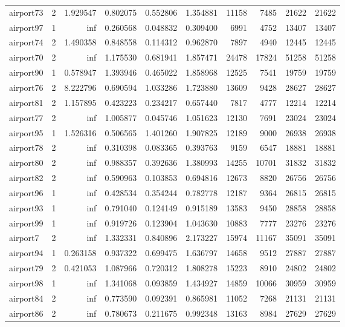\begin{longtable}{|l|r|r|r|r|r|r|r|r|r|}
airport73 & 2 & 1.929547 & 0.802075 & 0.552806 & 1.354881 & 11158 & 7485 & 21622 & 21622 \\
airport97 & 1 & inf & 0.260568 & 0.048832 & 0.309400 & 6991 & 4752 & 13407 & 13407 \\
airport74 & 2 & 1.490358 & 0.848558 & 0.114312 & 0.962870 & 7897 & 4940 & 12445 & 12445 \\
airport70 & 2 & inf & 1.175530 & 0.681941 & 1.857471 & 24478 & 17824 & 51258 & 51258 \\
airport90 & 1 & 0.578947 & 1.393946 & 0.465022 & 1.858968 & 12525 & 7541 & 19759 & 19759 \\
airport76 & 2 & 8.222796 & 0.690594 & 1.033286 & 1.723880 & 13609 & 9428 & 28627 & 28627 \\
airport81 & 2 & 1.157895 & 0.423223 & 0.234217 & 0.657440 & 7817 & 4777 & 12214 & 12214 \\
airport77 & 2 & inf & 1.005877 & 0.045746 & 1.051623 & 12130 & 7691 & 23024 & 23024 \\
airport95 & 1 & 1.526316 & 0.506565 & 1.401260 & 1.907825 & 12189 & 9000 & 26938 & 26938 \\
airport78 & 2 & inf & 0.310398 & 0.083365 & 0.393763 & 9159 & 6547 & 18881 & 18881 \\
airport80 & 2 & inf & 0.988357 & 0.392636 & 1.380993 & 14255 & 10701 & 31832 & 31832 \\
airport82 & 2 & inf & 0.590963 & 0.103853 & 0.694816 & 12673 & 8820 & 26756 & 26756 \\
airport96 & 1 & inf & 0.428534 & 0.354244 & 0.782778 & 12187 & 9364 & 26815 & 26815 \\
airport93 & 1 & inf & 0.791040 & 0.124149 & 0.915189 & 13583 & 9450 & 28858 & 28858 \\
airport99 & 1 & inf & 0.919726 & 0.123904 & 1.043630 & 10883 & 7777 & 23276 & 23276 \\
airport7 & 2 & inf & 1.332331 & 0.840896 & 2.173227 & 15974 & 11167 & 35091 & 35091 \\
airport94 & 1 & 0.263158 & 0.937322 & 0.699475 & 1.636797 & 14658 & 9512 & 27887 & 27887 \\
airport79 & 2 & 0.421053 & 1.087966 & 0.720312 & 1.808278 & 15223 & 8910 & 24802 & 24802 \\
airport98 & 1 & inf & 1.341068 & 0.093859 & 1.434927 & 14859 & 10066 & 30959 & 30959 \\
airport84 & 2 & inf & 0.773590 & 0.092391 & 0.865981 & 11052 & 7268 & 21131 & 21131 \\
airport86 & 2 & inf & 0.780673 & 0.211675 & 0.992348 & 13163 & 8984 & 27629 & 27629 \\

\end{longtable}
